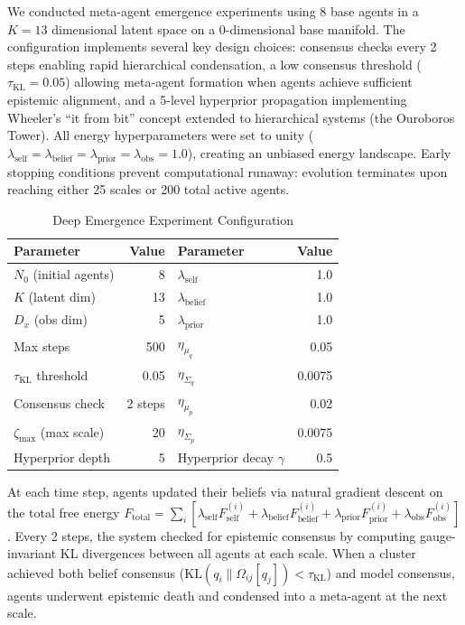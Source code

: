 \documentclass[11pt]{article}
\begin{document}
We conducted meta-agent emergence experiments using 8 base agents in a $K=13$ dimensional latent space on a 0-dimensional base manifold. The configuration implements several key design choices: consensus checks every 2 steps enabling rapid hierarchical condensation, a low consensus threshold ($\tau_{\text{KL}} = 0.05$) allowing meta-agent formation when agents achieve sufficient epistemic alignment, and a 5-level hyperprior propagation implementing Wheeler's ``it from bit'' concept extended to hierarchical systems (the Ouroboros Tower). All energy hyperparameters were set to unity ($\lambda_{\text{self}} = \lambda_{\text{belief}} = \lambda_{\text{prior}} = \lambda_{\text{obs}} = 1.0$), creating an unbiased energy landscape. Early stopping conditions prevent computational runaway: evolution terminates upon reaching either 25 scales or 200 total active agents.

\begin{table}[htbp]
\centering
\caption{Deep Emergence Experiment Configuration}
\label{tab:deep_emergence}
\small
\begin{tabular}{lr|lr}
\toprule
\textbf{Parameter} & \textbf{Value} & \textbf{Parameter} & \textbf{Value} \\
\midrule
$N_0$ (initial agents) & 8 & $\lambda_{\text{self}}$ & 1.0 \\
$K$ (latent dim) & 13 & $\lambda_{\text{belief}}$ & 1.0 \\
$D_x$ (obs dim) & 5 & $\lambda_{\text{prior}}$ & 1.0 \\
Max steps & 500 & $\eta_{\mu_q}$ & 0.05 \\
$\tau_{\text{KL}}$ threshold & 0.05 & $\eta_{\Sigma_q}$ & 0.0075 \\
Consensus check & 2 steps & $\eta_{\mu_p}$ & 0.02 \\
$\zeta_{\max}$ (max scale) & 20 & $\eta_{\Sigma_p}$ & 0.0075 \\
Hyperprior depth & 5 & Hyperprior decay $\gamma$ & 0.5 \\
\bottomrule
\end{tabular}
\end{table}

At each time step, agents updated their beliefs via natural gradient descent on the total free energy $F_{\text{total}} = \sum_i [ \lambda_{\text{self}} F_{\text{self}}^{(i)} + \lambda_{\text{belief}} F_{\text{belief}}^{(i)} + \lambda_{\text{prior}} F_{\text{prior}}^{(i)} + \lambda_{\text{obs}} F_{\text{obs}}^{(i)} ]$. Every 2 steps, the system checked for epistemic consensus by computing gauge-invariant KL divergences between all agents at each scale. When a cluster achieved both belief consensus ($\mathrm{KL}(q_i \| \Omega_{ij}[q_j]) < \tau_{\text{KL}}$) and model consensus, agents underwent epistemic death and condensed into a meta-agent at the next scale.
\end{document}
